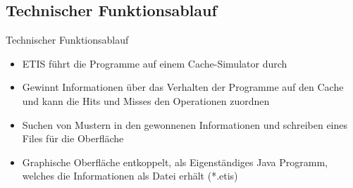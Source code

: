 \subsection{Technischer Funktionsablauf}
\begin{frame}
\begin{block}{Technischer Funktionsablauf}
\begin{itemize}[<+->]
\pause\item ETIS führt die Programme auf einem Cache-Simulator durch
\item Gewinnt Informationen über das Verhalten der Programme auf den Cache und kann die Hits und Misses den Operationen zuordnen
\item Suchen von Mustern in den gewonnenen Informationen und schreiben eines Files für die Oberfläche
\item Graphische Oberfläche entkoppelt, als Eigenständiges Java Programm, welches die Informationen als Datei erhält (*.etis)
\end{itemize}
\end{block}
\end{frame}

